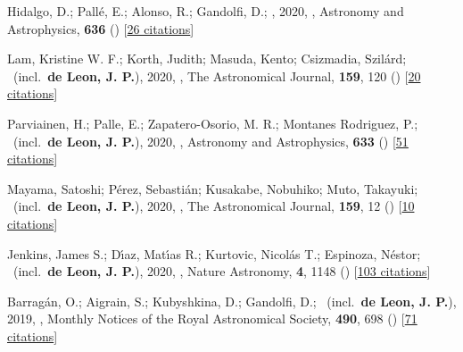 \item[{\color{numcolor}\scriptsize22}] Hidalgo, D.; Pall{\'e}, E.; Alonso, R.; Gandolfi, D.; \etal, 2020, , Astronomy and Astrophysics, \textbf{636} () [\href{https://ui.adsabs.harvard.edu/abs/2020A&A...636A..89H}{26 citations}]

\item[{\color{numcolor}\scriptsize21}] Lam, Kristine W. F.; Korth, Judith; Masuda, Kento; Csizmadia, Szil{\'a}rd; \etal\ (incl.\ \textbf{de Leon, J. P.}), 2020, , The Astronomical Journal, \textbf{159}, 120 () [\href{https://ui.adsabs.harvard.edu/abs/2020AJ....159..120L}{20 citations}]

\item[{\color{numcolor}\scriptsize20}] Parviainen, H.; Palle, E.; Zapatero-Osorio, M. R.; Montanes Rodriguez, P.; \etal\ (incl.\ \textbf{de Leon, J. P.}), 2020, , Astronomy and Astrophysics, \textbf{633} () [\href{https://ui.adsabs.harvard.edu/abs/2020A&A...633A..28P}{51 citations}]

\item[{\color{numcolor}\scriptsize19}] Mayama, Satoshi; P{\'e}rez, Sebasti{\'a}n; Kusakabe, Nobuhiko; Muto, Takayuki; \etal\ (incl.\ \textbf{de Leon, J. P.}), 2020, , The Astronomical Journal, \textbf{159}, 12 () [\href{https://ui.adsabs.harvard.edu/abs/2020AJ....159...12M}{10 citations}]

\item[{\color{numcolor}\scriptsize18}] Jenkins, James S.; D{\'\i}az, Mat{\'\i}as R.; Kurtovic, Nicol{\'a}s T.; Espinoza, N{\'e}stor; \etal\ (incl.\ \textbf{de Leon, J. P.}), 2020, , Nature Astronomy, \textbf{4}, 1148 () [\href{https://ui.adsabs.harvard.edu/abs/2020NatAs...4.1148J}{103 citations}]

\item[{\color{numcolor}\scriptsize17}] Barrag{\'a}n, O.; Aigrain, S.; Kubyshkina, D.; Gandolfi, D.; \etal\ (incl.\ \textbf{de Leon, J. P.}), 2019, , Monthly Notices of the Royal Astronomical Society, \textbf{490}, 698 () [\href{https://ui.adsabs.harvard.edu/abs/2019MNRAS.490..698B}{71 citations}]

